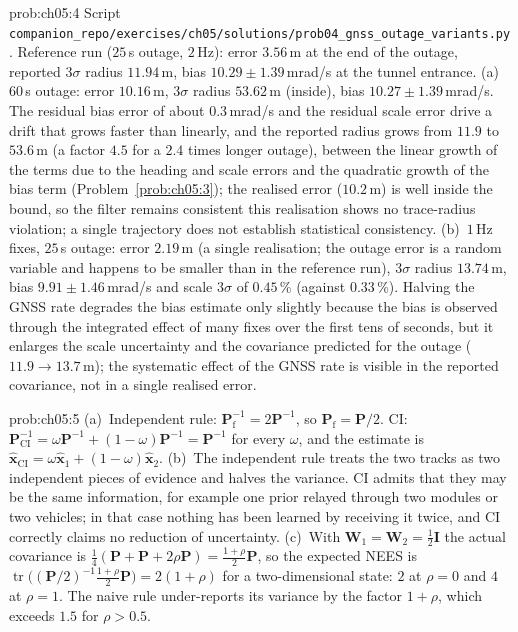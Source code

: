 \documentclass[graybox,envcountchap]{style/SNmono}
\DeclareMathOperator{\tr}{tr}
\newcommand{\repopath}[1]{\texttt{#1}}
\providecommand{\DIFadd}[1]{{\protect\color{blue} #1}} %
\providecommand{\DIFdel}[1]{{\protect\color{red} #1}} %
\providecommand{\DIFaddbegin}{} %
\providecommand{\DIFaddend}{} %
\providecommand{\DIFdelbegin}{} %
\providecommand{\DIFdelend}{} %
\begin{document}
\begin{sol}{prob:ch05:4}
Script \repopath{companion\_\allowbreak repo/\allowbreak exercises/\allowbreak ch05/\allowbreak solutions/\allowbreak prob04\_\allowbreak gnss\_\allowbreak outage\_\allowbreak variants.py}. Reference run ($25$\,s outage, $2$\,Hz): error $3.56$\,m at the end of the outage, reported $3\sigma$ radius $11.94$\,m, bias $10.29\pm1.39$\,mrad/s at the tunnel entrance. (a)~$60$\,s outage: error $10.16$\,m, $3\sigma$ radius $53.62$\,m (inside), bias $10.27\pm1.39$\,mrad/s. The residual bias error of about $0.3$\,mrad/s and the residual scale error drive a drift that grows faster than linearly, and the reported radius grows from $11.9$ to $53.6$\,m (a factor $4.5$ for a $2.4$ times longer outage), between the linear growth of the terms due to the heading and scale errors and the quadratic growth of the bias term (Problem~\ref{prob:ch05:3}); the realised error ($10.2$\,m) is well inside the bound, so \DIFdelbegin \DIFdel{the filter remains consistent}\DIFdelend \DIFaddbegin \DIFadd{this realisation shows no trace-radius violation; a single trajectory does not establish statistical consistency}\DIFaddend . (b)~$1$\,Hz fixes, $25$\,s outage: error $2.19$\,m (a single realisation; the outage error is a random variable and happens to be smaller than in the reference run), $3\sigma$ radius $13.74$\,m, bias $9.91\pm1.46$\,mrad/s and scale $3\sigma$ of $0.45$\,\% (against $0.33$\,\%). Halving the GNSS rate degrades the bias estimate only slightly because the bias is observed through the integrated effect of many fixes over the first tens of seconds, but it enlarges the scale uncertainty and the covariance predicted for the outage ($11.9\to13.7$\,m); the systematic effect of the GNSS rate is visible in the reported covariance, not in a single realised error.
\end{sol}

\begin{sol}{prob:ch05:5}
(a)~Independent rule: $\mathbf{P}_{\mathrm{f}}^{-1}=2\mathbf{P}^{-1}$, so $\mathbf{P}_{\mathrm{f}}=\mathbf{P}/2$. CI: $\mathbf{P}_{\mathrm{CI}}^{-1}=\omega\mathbf{P}^{-1}+(1-\omega)\mathbf{P}^{-1}=\mathbf{P}^{-1}$ for every $\omega$, and the estimate is $\widehat{\mathbf{x}}_{\mathrm{CI}}=\omega\widehat{\mathbf{x}}_{1}+(1-\omega)\widehat{\mathbf{x}}_{2}$. (b)~The independent rule treats the two tracks as two independent pieces of evidence and halves the variance. CI admits that they may be the same information, for example one prior relayed through two modules or two vehicles; in that case nothing has been learned by receiving it twice, and CI correctly claims no reduction of uncertainty. (c)~With $\mathbf{W}_{1}=\mathbf{W}_{2}=\tfrac{1}{2}\mathbf{I}$ the actual covariance is $\tfrac{1}{4}(\mathbf{P}+\mathbf{P}+2\rho\mathbf{P})=\tfrac{1+\rho}{2}\mathbf{P}$, so the expected NEES is $\tr\big((\mathbf{P}/2)^{-1}\tfrac{1+\rho}{2}\mathbf{P}\big)=2(1+\rho)$ for a two-dimensional state: $2$ at $\rho=0$ and $4$ at $\rho=1$. The naive rule under-reports its variance by the factor $1+\rho$, which exceeds $1.5$ for $\rho>0.5$.
\end{sol}
\end{document}
